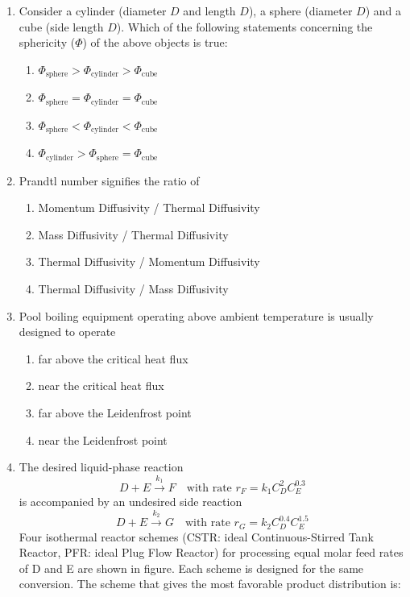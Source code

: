\documentclass[12pt]{article}
\begin{document}
\begin{enumerate}[label=Q.\arabic*]
	\item Consider a cylinder (diameter $D$ and length $D$), a sphere (diameter $D$) and a cube (side length $D$). Which of the following statements concerning the sphericity ($\Phi$) of the above objects is true:
		\begin{multicols}{2}
			\begin{enumerate}[label=(\Alph*)]
				\item $\Phi_{\text{sphere}} > \Phi_{\text{cylinder}} > \Phi_{\text{cube}}$
				\item $\Phi_{\text{sphere}} = \Phi_{\text{cylinder}} = \Phi_{\text{cube}}$
				\item $\Phi_{\text{sphere}} < \Phi_{\text{cylinder}} < \Phi_{\text{cube}}$
				\item $\Phi_{\text{cylinder}} > \Phi_{\text{sphere}} = \Phi_{\text{cube}}$
			\end{enumerate}
		\end{multicols}

	\item Prandtl number signifies the ratio of
		\begin{multicols}{2}
			\begin{enumerate}[label=(\Alph*)]
				\item Momentum Diffusivity / Thermal Diffusivity
				\item Mass Diffusivity / Thermal Diffusivity
				\item Thermal Diffusivity / Momentum Diffusivity
				\item Thermal Diffusivity / Mass Diffusivity
			\end{enumerate}
		\end{multicols}

	\item Pool boiling equipment operating above ambient temperature is usually designed to operate
		\begin{multicols}{2}
			\begin{enumerate}[label=(\Alph*)]
				\item far above the critical heat flux
				\item near the critical heat flux
				\item far above the Leidenfrost point
				\item near the Leidenfrost point
			\end{enumerate}
		\end{multicols}

	\item The desired liquid-phase reaction
		\[ D + E \xrightarrow{k_1} F \quad \text{with rate } r_F = k_1 C_D^2 C_E^{0.3} \]
		is accompanied by an undesired side reaction
		\[ D + E \xrightarrow{k_2} G \quad \text{with rate } r_G = k_2 C_D^{0.4} C_E^{1.5} \]
		Four isothermal reactor schemes (CSTR: ideal Continuous-Stirred Tank Reactor, PFR: ideal Plug Flow Reactor) for processing equal molar feed rates of D and E are shown in figure. Each scheme is designed for the same conversion. The scheme that gives the most favorable product distribution is:


\end{enumerate}
\end{document}
